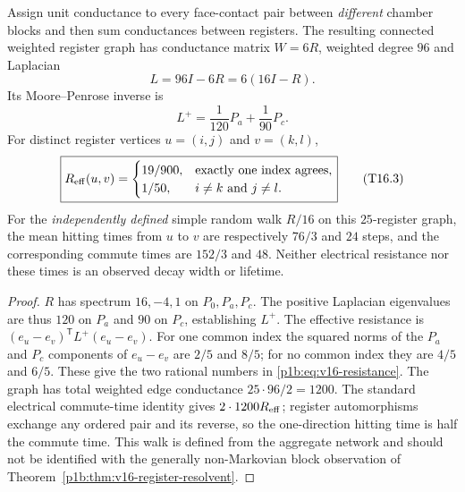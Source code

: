 \documentclass[11pt]{article}
\begin{document}
\begin{theorem}
\label{p1b:thm:v16-register-resistance}
Assign unit conductance to every face-contact pair between
\emph{different} chamber blocks and then sum conductances between
registers.  The resulting connected weighted register graph has
conductance matrix $W=6R$, weighted degree $96$ and Laplacian
\[L=96I-6R=6(16I-R).
\]
Its Moore--Penrose inverse is
\[\boxed{L^+=\frac1{120}P_a+\frac1{90}P_c.}\]
For distinct register vertices $u=(i,j)$ and $v=(k,l)$,
\begin{equation}
\boxed{R_{\rm eff}(u,v)=
\begin{cases}
19/900,&\text{exactly one index agrees},\\
1/50,&i\ne k\text{ and }j\ne l.
\end{cases}}
\tag{T16.3}\label{p1b:eq:v16-resistance}
\end{equation}
For the \emph{independently defined} simple random walk
$R/16$ on this $25$-register graph, the mean hitting times
from $u$ to $v$ are respectively $76/3$ and $24$ steps, and
the corresponding commute times are $152/3$ and $48$.
Neither electrical resistance nor these times is an observed decay
width or lifetime.
\end{theorem}
\begin{proof}
$R$ has spectrum $16,-4,1$ on $P_0,P_a,P_c$.
The positive Laplacian eigenvalues are thus $120$ on $P_a$ and
$90$ on $P_c$, establishing $L^+$.  The effective resistance is
$(e_u-e_v)^\mathsf TL^+(e_u-e_v)$.  For one common index
the squared norms of the $P_a$ and $P_c$ components of $e_u-e_v$
are $2/5$ and $8/5$; for no common index they are $4/5$ and
$6/5$.  These give the two rational numbers in
\eqref{p1b:eq:v16-resistance}.  The graph has total weighted
edge conductance $25\cdot96/2=1200$.  The standard electrical
commute-time identity gives $2\cdot1200 R_{\rm eff}$; register
automorphisms exchange any ordered pair and its reverse, so the
one-direction hitting time is half the commute time.
This walk is defined from the aggregate network and should not be
identified with the generally non-Markovian block observation of
Theorem~\ref{p1b:thm:v16-register-resolvent}.
\end{proof}
\end{document}
